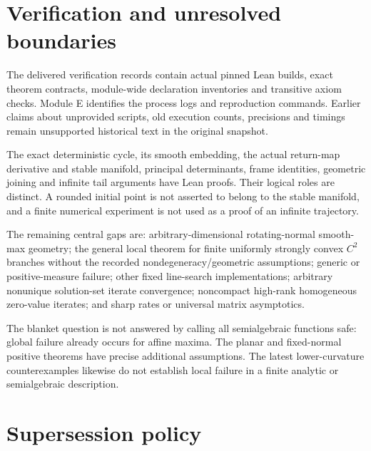 \section{Verification and unresolved boundaries}\label{verification-and-unresolved-boundaries}

The delivered verification records contain actual pinned Lean builds, exact theorem contracts, module-wide declaration inventories and transitive axiom checks. Module E identifies the process logs and reproduction commands. Earlier claims about unprovided scripts, old execution counts, precisions and timings remain unsupported historical text in the original snapshot.

The exact deterministic cycle, its smooth embedding, the actual return-map derivative and stable manifold, principal determinants, frame identities, geometric joining and infinite tail arguments have Lean proofs. Their logical roles are distinct. A rounded initial point is not asserted to belong to the stable manifold, and a finite numerical experiment is not used as a proof of an infinite trajectory.

The remaining central gaps are: arbitrary-dimensional rotating-normal smooth-max geometry; the general local theorem for finite uniformly strongly convex \(C^2\) branches without the recorded nondegeneracy/geometric assumptions; generic or positive-measure failure; other fixed line-search implementations; arbitrary nonunique solution-set iterate convergence; noncompact high-rank homogeneous zero-value iterates; and sharp rates or universal matrix asymptotics.

The blanket question is not answered by calling all semialgebraic functions safe: global failure already occurs for affine maxima. The planar and fixed-normal positive theorems have precise additional assumptions. The latest lower-curvature counterexamples likewise do not establish local failure in a finite analytic or semialgebraic description.

\section{Supersession policy}\label{supersession-policy}

